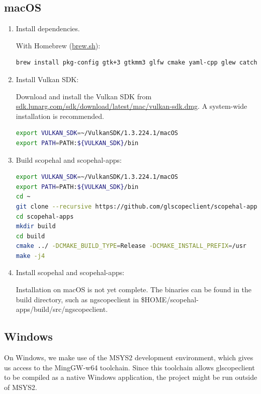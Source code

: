 \subsection{macOS}
\begin{enumerate}

\item Install dependencies.

With Homebrew (\href{https://brew.sh}{brew.sh}):

\begin{lstlisting}[language=sh, numbers=none]
brew install pkg-config gtk+3 gtkmm3 glfw cmake yaml-cpp glew catch2
\end{lstlisting}

\item Install Vulkan SDK:

Download and install the Vulkan SDK from \href{https://sdk.lunarg.com/sdk/download/latest/mac/vulkan-sdk.dmg}{sdk.lunarg.com/sdk/download/latest/mac/vulkan-sdk.dmg}.
A system-wide installation is recommended.

\begin{lstlisting}[language=sh, numbers=none]
export VULKAN_SDK=~/VulkanSDK/1.3.224.1/macOS
export PATH=PATH:${VULKAN_SDK}/bin
\end{lstlisting}

\item Build scopehal and scopehal-apps:

\begin{lstlisting}[language=sh, numbers=none]
export VULKAN_SDK=~/VulkanSDK/1.3.224.1/macOS
export PATH=PATH:${VULKAN_SDK}/bin
cd ~
git clone --recursive https://github.com/glscopeclient/scopehal-apps.git
cd scopehal-apps
mkdir build
cd build
cmake ../ -DCMAKE_BUILD_TYPE=Release -DCMAKE_INSTALL_PREFIX=/usr
make -j4
\end{lstlisting}

\item Install scopehal and scopehal-apps:

Installation on macOS is not yet complete.
The binaries can be found in the build directory, such as ngscopeclient in \$HOME/scopehal-apps/build/src/ngscopeclient.

\end{enumerate}

\subsection{Windows}

On Windows, we make use of the MSYS2 development environment, which gives us access to the MingGW-w64 toolchain.
Since this toolchain allows glscopeclient to be compiled as a native Windows application, the project might be run
outside of MSYS2.

